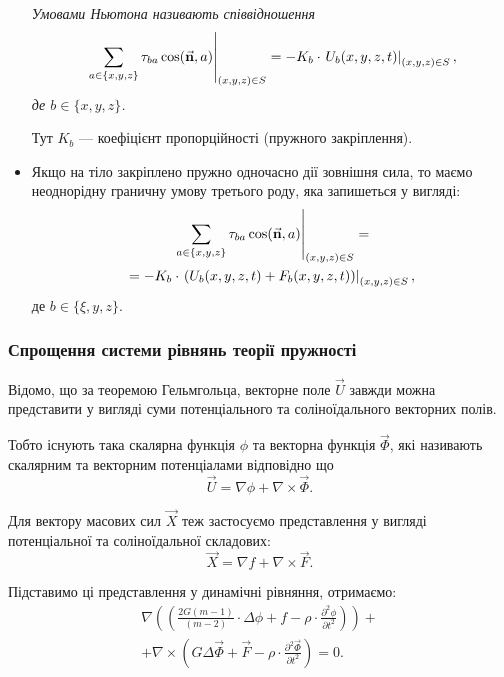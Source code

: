 \begin{itemize}
	\begin{definition}
		\it{Умовами Ньютона} називають співвідношення
		\begin{equation}
			\left. \displaystyle\sum\limits_{a \in \{x, y, z\}} \tau_{b a} \cos(\vec{\textbf{n}}, a) \right|_{(x, y, z) \in S} = - K_b \cdot \left. U_b(x, y, z, t) \right|_{(x, y, z) \in S},
		\end{equation}
		де $b \in \{x, y, z\}$.
	\end{definition}

	\begin{remark}
		Тут $K_b$ --- коефіцієнт пропорційності (пружного закріплення).
	\end{remark}

	\item Якщо на тіло закріплено пружно одночасно дії зовнішня сила, то маємо неоднорідну граничну умову третього роду, яка запишеться у вигляді:
	\begin{multline}
		\left. \displaystyle\sum\limits_{a \in \{x, y, z\}} \tau_{b a} \cos(\vec{\textbf{n}}, a) \right|_{(x, y, z) \in S} = \\
		= - K_b \cdot \left. \left( U_b(x, y, z, t) + F_b(x, y, z, t) \right) \right|_{(x, y, z) \in S},
	\end{multline}
	де $b \in \{\xi, y, z\}$.
\end{itemize}

\subsubsection{Спрощення системи рівнянь теорії пружності}

Відомо, що за теоремою Гельмгольца, векторне поле $\vec U$ завжди можна представити у вигляді суми потенціального та соліноїдального векторних полів. \medskip

Тобто існують така скалярна функція $\phi$ та векторна функція $\vec \Phi$, які називають скалярним та векторним потенціалами відповідно що
\begin{equation}
	\vec U = \nabla \phi + \nabla \times \vec \Phi.
\end{equation}

Для вектору масових сил $\vec X$ теж застосуємо представлення у вигляді потенціальної та соліноїдальної складових:
\begin{equation}
	\vec X = \nabla f + \nabla \times \vec F.
\end{equation}

Підставимо ці представлення у динамічні рівняння, отримаємо:
\begin{multline}
	\nabla \left( \left( \frac{2 G (m - 1)}{(m - 2)} \cdot \Delta \phi + f - \rho \cdot \frac{\partial^2 \phi}{\partial t^2} \right) \right) + \\
	+ \nabla \times \left( G \Delta \vec \Phi + \Vec F - \rho \cdot \frac{\partial^2 \vec \Phi}{\partial t^2} \right) = 0.
\end{multline}

